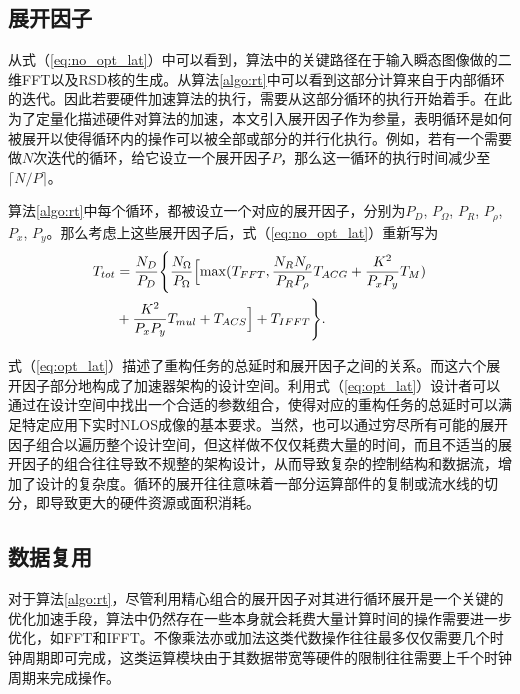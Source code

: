\documentclass[master]{shtthesis}             %
\begin{document}
\subsection{展开因子}

从式（\ref{eq:no_opt_lat}）中可以看到，算法中的关键路径在于输入瞬态图像做的二维FFT以及RSD核的生成。从算法\ref{algo:rt}中可以看到这部分计算来自于内部循环的迭代。因此若要硬件加速算法的执行，需要从这部分循环的执行开始着手。在此为了定量化描述硬件对算法的加速，本文引入展开因子作为参量，表明循环是如何被展开以使得循环内的操作可以被全部或部分的并行化执行。例如，若有一个需要做$N$次迭代的循环，给它设立一个展开因子$P$，那么这一循环的执行时间减少至$\lceil N/P \rceil$。

算法\ref{algo:rt}中每个循环，都被设立一个对应的展开因子，分别为$P_D$, $P_\Omega$, $P_R$, $P_\rho$, $P_x$, $P_y$。那么考虑上这些展开因子后，式（\ref{eq:no_opt_lat}）重新写为
\begin{equation}
    \begin{split}
        T_{tot} &= \frac{N_D}{P_D} \Biggl\{ \frac{N_{\Omega}}{P_{\Omega}} \Bigl[ \max (T_{FFT}, \frac{N_{ {R}}N_{\rho}}{P_{ {R}}P_{\rho}} T_{ACG}+\frac{K^2}{P_xP_y}T_M)\\ &+ \frac{K^2}{P_xP_y}T_{mul}+T_{ACS} \Bigr] + T_{IFFT}\Biggr\} \label{eq:opt_lat}.
    \end{split}
\end{equation}

式（\ref{eq:opt_lat}）描述了重构任务的总延时和展开因子之间的关系。而这六个展开因子部分地构成了加速器架构的设计空间。利用式（\ref{eq:opt_lat}）设计者可以通过在设计空间中找出一个合适的参数组合，使得对应的重构任务的总延时可以满足特定应用下实时NLOS成像的基本要求。当然，也可以通过穷尽所有可能的展开因子组合以遍历整个设计空间，但这样做不仅仅耗费大量的时间，而且不适当的展开因子的组合往往导致不规整的架构设计，从而导致复杂的控制结构和数据流，增加了设计的复杂度。循环的展开往往意味着一部分运算部件的复制或流水线的切分，即导致更大的硬件资源或面积消耗。%

\subsection{数据复用}

对于算法\ref{algo:rt}，尽管利用精心组合的展开因子对其进行循环展开是一个关键的优化加速手段，算法中仍然存在一些本身就会耗费大量计算时间的操作需要进一步优化，如FFT和IFFT。不像乘法亦或加法这类代数操作往往最多仅仅需要几个时钟周期即可完成，这类运算模块由于其数据带宽等硬件的限制往往需要上千个时钟周期来完成操作。
\end{document}
